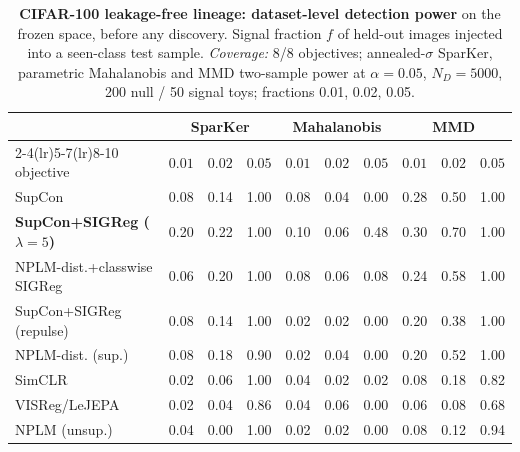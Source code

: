 \begin{table}[t]
\centering
\small
\begin{tabular}{lccccccccc}
\toprule
& \multicolumn{3}{c}{SparKer} & \multicolumn{3}{c}{Mahalanobis} & \multicolumn{3}{c}{MMD} \\
\cmidrule(lr){2-4}\cmidrule(lr){5-7}\cmidrule(lr){8-10}
objective & $0.01$ & $0.02$ & $0.05$ & $0.01$ & $0.02$ & $0.05$ & $0.01$ & $0.02$ & $0.05$ \\
\midrule
SupCon & 0.08 & 0.14 & 1.00 & 0.08 & 0.04 & 0.00 & 0.28 & 0.50 & 1.00 \\
\textbf{SupCon+SIGReg ($\lambda{=}5$)} & 0.20 & 0.22 & 1.00 & 0.10 & 0.06 & 0.48 & 0.30 & 0.70 & 1.00 \\
NPLM-dist.+classwise SIGReg & 0.06 & 0.20 & 1.00 & 0.08 & 0.06 & 0.08 & 0.24 & 0.58 & 1.00 \\
SupCon+SIGReg (repulse) & 0.08 & 0.14 & 1.00 & 0.02 & 0.02 & 0.00 & 0.20 & 0.38 & 1.00 \\
NPLM-dist. (sup.) & 0.08 & 0.18 & 0.90 & 0.02 & 0.04 & 0.00 & 0.20 & 0.52 & 1.00 \\
SimCLR & 0.02 & 0.06 & 1.00 & 0.04 & 0.02 & 0.02 & 0.08 & 0.18 & 0.82 \\
VISReg/LeJEPA & 0.02 & 0.04 & 0.86 & 0.04 & 0.06 & 0.00 & 0.06 & 0.08 & 0.68 \\
NPLM (unsup.) & 0.04 & 0.00 & 1.00 & 0.02 & 0.02 & 0.00 & 0.08 & 0.12 & 0.94 \\
\bottomrule
\end{tabular}
\caption{\textbf{CIFAR-100 leakage-free lineage: dataset-level detection power} on the frozen space, before any discovery. Signal fraction $f$ of held-out images injected into a seen-class test sample. \emph{Coverage:} 8/8 objectives; annealed-$\sigma$ SparKer, parametric Mahalanobis and MMD two-sample power at $\alpha{=}0.05$, $N_D{=}5000$, 200 null / 50 signal toys; fractions 0.01, 0.02, 0.05.}
\label{tab:app_cifar100_power}
\end{table}
